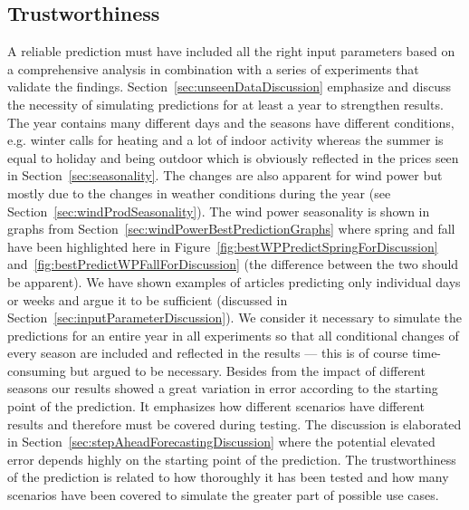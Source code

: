 
\subsection{Trustworthiness}
A reliable prediction must have included all the right input parameters based on a comprehensive analysis in combination with a series of experiments that validate the findings. Section~\ref{sec:unseenDataDiscussion} emphasize and discuss the necessity of simulating predictions for at least a year to strengthen results. The year contains many different days and the seasons have different conditions, e.g. winter calls for heating and a lot of indoor activity whereas the summer is equal to holiday and being outdoor which is obviously reflected in the prices seen in Section~\ref{sec:seasonality}. The changes are also apparent for wind power but mostly due to the changes in weather conditions during the year (see Section~\ref{sec:windProdSeasonality}). The wind power seasonality is shown in graphs from Section~\ref{sec:windPowerBestPredictionGraphs} where spring and fall have been highlighted here in Figure~\ref{fig:bestWPPredictSpringForDiscussion} and~\ref{fig:bestPredictWPFallForDiscussion} (the difference between the two should be apparent). We have shown examples of articles predicting only individual days or weeks and argue it to be sufficient (discussed in Section~\ref{sec:inputParameterDiscussion}). We consider it necessary to simulate the predictions for an entire year in all experiments so that all conditional changes of every season are included and reflected in the results --- this is of course time-consuming but argued to be necessary. Besides from the impact of different seasons our results showed a great variation in error according to the starting point of the prediction. It emphasizes how different scenarios have different results and therefore must be covered during testing. The discussion is elaborated in Section~\ref{sec:stepAheadForecastingDiscussion} where the potential elevated error depends highly on the starting point of the prediction. The trustworthiness of the prediction is related to how thoroughly it has been tested and how many scenarios have been covered to simulate the greater part of possible use cases. 

